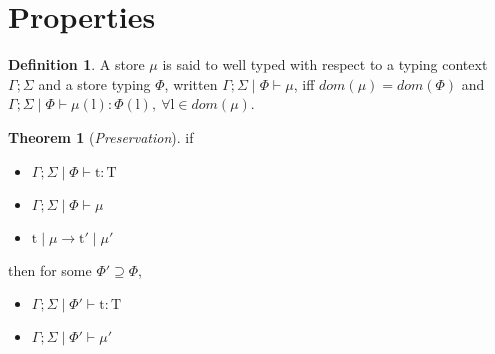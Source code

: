 \documentclass[10pt]{article}
\newcommand{\lto}{\longrightarrow}
\newcommand{\context}{\Gamma;\Sigma\mid\Phi}
\theoremstyle{definition}\newtheorem*{theorem}{Theorem}
\theoremstyle{definition}\newtheorem*{definition}{Definition}
\theoremstyle{definition}\newtheorem*{lemma}{Lemma}
\begin{document}
    \section{Properties}
    \begin{definition}
        A store $\mu$ is said to well typed with respect to a typing context $\Gamma;\Sigma$ and a store typing $\Phi$,
        written $\context\vdash\mu$, iff $dom(\mu) = dom(\Phi)$ and $\context\vdash \mu(\mathrm{l})\colon\Phi(\mathrm{l}),\ \forall \mathrm{l} \in dom(\mu)$.
    \end{definition}
    \begin{theorem}[{\it Preservation}]
        if 
        \begin{itemize}
            \item[] $\context\vdash\mathrm{t}\colon\mathrm{T}$
            \item[] $\context\vdash\mu$
            \item[] $\mathrm{t}\mid\mu\lto\mathrm{t'}\mid\mu'$
        \end{itemize}
        then for some $\Phi'\supseteq\Phi$,
        \begin{itemize}
            \item[] $\Gamma;\Sigma\mid\Phi'\vdash\mathrm{t}\colon\mathrm{T}$
            \item[] $\Gamma;\Sigma\mid\Phi'\vdash\mu'$
        \end{itemize}
    \end{theorem}
\end{document}
